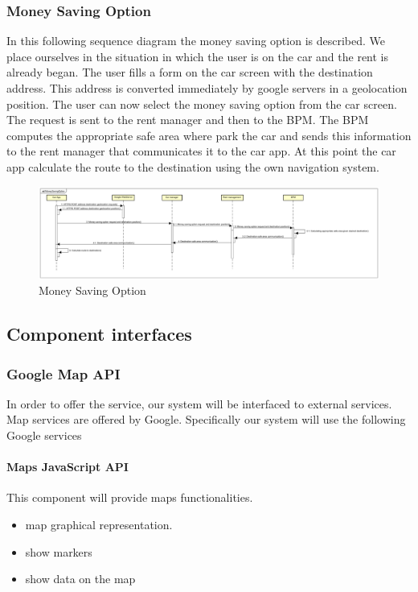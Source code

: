 \documentclass[english]{article}
\begin{document}
		\subsubsection{Money Saving Option}
		In this following sequence diagram the money saving option is described.
		We place ourselves in the situation in which the user is on the car and the rent is already began.
		The user fills a form on the car screen with the destination address. This address is converted immediately by google servers in a geolocation position.
		The user can now select the money saving option from the car screen. The request is sent to the rent manager and then to the BPM. The BPM computes the appropriate safe area where park the car and sends this information to the rent manager that communicates it to the car app.
		At this point the car app calculate the route to the destination using the own navigation system.
	\begin{landscape}
		\begin{figure}[H]
				\centering
				\includegraphics[scale=0.225]{./SequenceDiagrams/MoneySavingOption/MoneySavingOption.pdf}%
				\caption{Money Saving Option}
		\end{figure}
	\end{landscape}
	\subsection{Component interfaces}
	\subsubsection*{Google Map API}
		In order to offer the service, our system will be interfaced to external services. 
		Map services are offered by Google.
		Specifically our system will use the following Google services
	\paragraph {Maps JavaScript API}
		This component will provide maps functionalities. 
	\begin{itemize}
		\item map graphical representation.
		\item show markers
		\item show data on the map
	\end{itemize}
\end{document}
